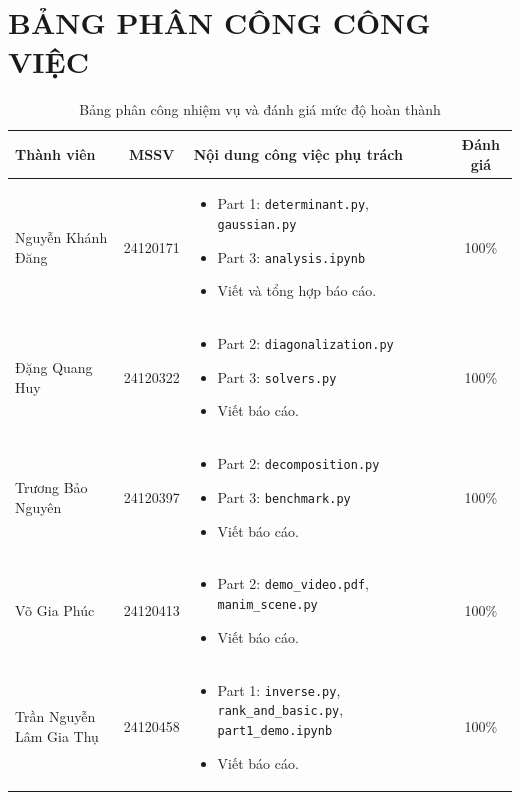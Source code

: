 \documentclass[a4paper,12pt]{article}
\begin{document}
\section{BẢNG PHÂN CÔNG CÔNG VIỆC}
\noindent
\begin{table}[H]
    \centering
    \label{tab:phan-cong}
    \begin{tabularx}{\textwidth}{|l|c|>{\RaggedRight\arraybackslash}X|c|}
    \hline
    \rowcolor[HTML]{EFEFEF} 
    \textbf{Thành viên} & \textbf{MSSV} & \textbf{Nội dung công việc phụ trách} & \textbf{Đánh giá} \\ \hline
    Nguyễn Khánh Đăng & 24120171 & 
\begin{itemize}[leftmargin=*, nosep]
    \item Part 1: \texttt{determinant.py}, \texttt{gaussian.py}
    \item Part 3: \texttt{analysis.ipynb}
    \item Viết và tổng hợp báo cáo.
\end{itemize} & 100\% \\ \hline
Đặng Quang Huy & 24120322 & 
\begin{itemize}[leftmargin=*, nosep]
    \item Part 2: \texttt{diagonalization.py}
    \item Part 3: \texttt{solvers.py}
    \item Viết báo cáo.
\end{itemize} & 100\% \\ \hline
Trương Bảo Nguyên & 24120397 & 
\begin{itemize}[leftmargin=*, nosep]
    \item Part 2: \texttt{decomposition.py}
    \item Part 3: \texttt{benchmark.py}
    \item Viết báo cáo.
\end{itemize} & 100\% \\ \hline
Võ Gia Phúc & 24120413 & 
\begin{itemize}[leftmargin=*, nosep]
    \item Part 2: \texttt{demo\_video.pdf}, \texttt{manim\_scene.py}
    \item Viết báo cáo.
\end{itemize} & 100\% \\ \hline
Trần Nguyễn Lâm Gia Thụ & 24120458 & 
\begin{itemize}[leftmargin=*, nosep]
    \item Part 1: \texttt{inverse.py}, \texttt{rank\_and\_basic.py}, \texttt{part1\_demo.ipynb}
    \item Viết báo cáo.
\end{itemize} & 100\% \\ \hline
    \end{tabularx}
    \caption{Bảng phân công nhiệm vụ và đánh giá mức độ hoàn thành}
\end{table}
\end{document}
